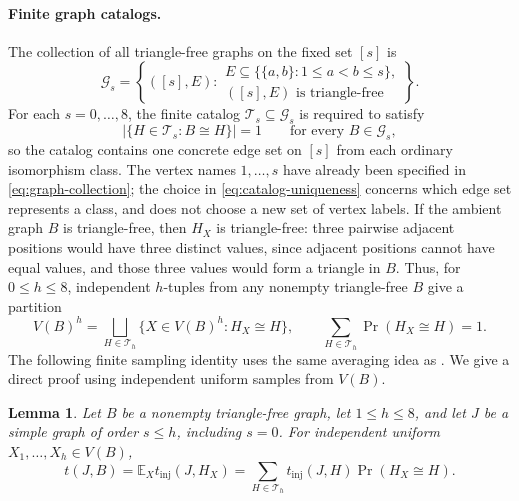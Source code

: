 \documentclass[11pt]{article}
\newcommand{\E}{\mathbb E}
\newtheorem{lemma}{Lemma}
\begin{document}
\paragraph{Finite graph catalogs.}
The collection of all triangle-free graphs on the fixed set $[s]$ is
\begin{equation}\label{eq:graph-collection}
\mathcal G_s=
\left\{([s],E):
\begin{array}{l}
E\subseteq\{\{a,b\}:1\leq a<b\leq s\},\\
([s],E)\text{ is triangle-free}
\end{array}\right\}.
\end{equation}
For each $s=0,\ldots,8$, the finite catalog $\mathcal T_s\subseteq\mathcal G_s$ is required to satisfy
\begin{equation}\label{eq:catalog-uniqueness}
\left|\{H\in\mathcal T_s:B\cong H\}\right|=1
\qquad\text{for every }B\in\mathcal G_s,
\end{equation}
so the catalog contains one concrete edge set on $[s]$ from each ordinary isomorphism class.
The vertex names $1,\ldots,s$ have already been specified in \eqref{eq:graph-collection}; the choice in \eqref{eq:catalog-uniqueness} concerns which edge set represents a class, and does not choose a new set of vertex labels.
If the ambient graph $B$ is triangle-free, then $H_X$ is triangle-free: three pairwise adjacent positions would have three distinct values, since adjacent positions cannot have equal values, and those three values would form a triangle in $B$.
Thus, for $0\leq h\leq8$, independent $h$-tuples from any nonempty triangle-free $B$ give a partition
\begin{equation}\label{eq:source-partition}
V(B)^h=\bigsqcup_{H\in\mathcal T_h}\{X\in V(B)^h:H_X\cong H\},
\qquad
\sum_{H\in\mathcal T_h}\Pr(H_X\cong H)=1.
\end{equation}
The following finite sampling identity uses the same averaging idea as
\cite[proof of Proposition~11.32]{Lovasz}.
We give a direct proof using independent uniform samples from $V(B)$.
\begin{lemma}\label{lem:source-lift}
Let $B$ be a nonempty triangle-free graph, let $1\leq h\leq8$, and let $J$ be a simple graph of order $s\leq h$, including $s=0$.
For independent uniform $X_1,\ldots,X_h\in V(B)$,
\begin{equation}\label{eq:exact-source-lift}
t(J,B)=\E_X t_{\mathrm{inj}}(J,H_X)
=\sum_{H\in\mathcal T_h}t_{\mathrm{inj}}(J,H)\Pr(H_X\cong H).
\end{equation}
\end{lemma}
\end{document}
